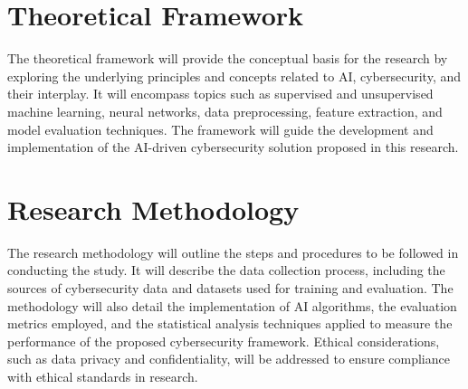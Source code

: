 \documentclass[a4paper,man,12pt]{article}
\begin{document}
\section{Theoretical Framework}


The theoretical framework will provide the conceptual basis for the research by exploring the underlying principles and concepts related to AI, cybersecurity, and their interplay. It will encompass topics such as supervised and unsupervised machine learning, neural networks, data preprocessing, feature extraction, and model evaluation techniques. The framework will guide the development and implementation of the AI-driven cybersecurity solution proposed in this research.



\section{Research Methodology}

  
  The research methodology will outline the steps and procedures to be followed in conducting the study. It will describe the data collection process, including the sources of cybersecurity data and datasets used for training and evaluation. The methodology will also detail the implementation of AI algorithms, the evaluation metrics employed, and the statistical analysis techniques applied to measure the performance of the proposed cybersecurity framework. Ethical considerations, such as data privacy and confidentiality, will be addressed to ensure compliance with ethical standards in research.
\end{document}
